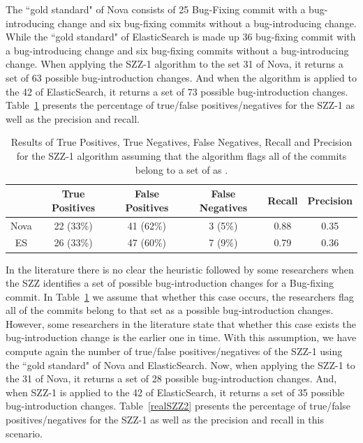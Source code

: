 \documentclass[a4paper, 12pt]{book}
\begin{document}
The ``gold standard" of Nova consists of 25 Bug-Fixing commit with a bug-introducing change and six bug-fixing commits without a bug-introducing change. While the ``gold standard" of ElasticSearch is made up 36 bug-fixing commit with a bug-introducing change and six bug-fixing commits without a bug-introducing change. When applying the SZZ-1 algorithm to the set 31 \BFC of Nova, it returns a set of 63 possible bug-introduction changes. And when the algorithm is applied to the 42 \BFC of ElasticSearch, it returns a set of 73 possible bug-introduction changes. Table~\ref{realSZZ} presents the percentage of true/false positives/negatives for the SZZ-1 as well as the precision and recall.

\begin{table}[!t]
	\renewcommand{\arraystretch}{1.3}
	\caption{Results of True Positives, True Negatives, False Negatives, Recall and Precision for the SZZ-1 algorithm assuming that the algorithm flags all of the commits belong to a set of  as \BIC.}
	\label{realSZZ}
	\centering
	\begin{tabular}{|c|c|c|c|c|c|}
		\hline
 	 	&  True Positives & False Positives & False Negatives & Recall & Precision \\
		\hline
		\hline
		Nova & 22 (33\%) & 41 (62\%) & 3 (5\%) & 0.88 & 0.35\\
		\hline
		ES &  26 (33\%) & 47 (60\%) & 7 (9\%)& 0.79 & 0.36 \\
		\hline
	\end{tabular}
\end{table}

In the literature there is no clear the heuristic followed by some researchers when the SZZ identifies a set of possible bug-introduction changes for a Bug-fixing commit. In Table~\ref{realSZZ} we assume that whether this case occurs, the researchers flag all of the commits belong to that set as a possible bug-introduction changes. However, some researchers in the literature state that whether this case exists the bug-introduction change is the earlier one in time. With this assumption, we have compute again the number of true/false positives/negatives of the SZZ-1 using the ``gold standard" of Nova and ElasticSearch. Now, when applying the SZZ-1 to the 31 \BFC of Nova, it returns a set of 28 possible bug-introduction changes. And, when SZZ-1 is applied to the 42 \BFC of ElasticSearch, it returns a set of 35 possible bug-introduction changes. Table~\ref{realSZZ2} presents the percentage of true/false positives/negatives for the SZZ-1 as well as the precision and recall in this scenario.
\end{document}
